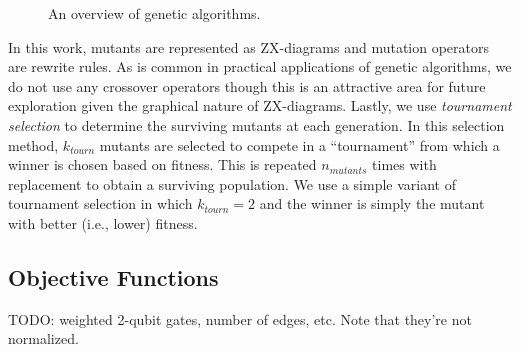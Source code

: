 \begin{figure}
\centering
{}
\caption{An overview of genetic algorithms.}
\label{fig:ga}
\end{figure}

In this work, mutants are represented as ZX-diagrams and mutation operators are rewrite rules.
As is common in practical applications of genetic algorithms, we do not use any crossover operators though this is an attractive area for future exploration given the graphical nature of ZX-diagrams. %
Lastly, we use \emph{tournament selection} to determine the surviving mutants at each generation.
In this selection method, $k_{tourn}$ mutants are selected to compete in a ``tournament'' from which a winner is chosen based on fitness.
This is repeated $n_{mutants}$ times with replacement to obtain a surviving population.
We use a simple variant of tournament selection in which $k_{tourn} = 2$ and the winner is simply the mutant with better (i.e., lower) fitness.


\subsection{Objective Functions}\label{sec:obj-funcs}


TODO: weighted 2-qubit gates, number of edges, etc. Note that they're not normalized.


